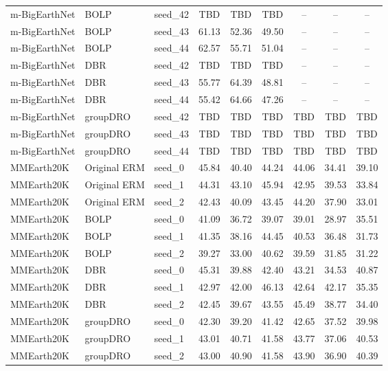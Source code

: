 \documentclass[11pt]{article}
\begin{document}
\begin{table}[h!]
{\begin{tabular}{lllcccccc}
m-BigEarthNet & BOLP & seed\_42 & TBD & TBD & TBD & -- & -- & -- \\
m-BigEarthNet & BOLP & seed\_43 & 61.13 & 52.36 & 49.50 & -- & -- & -- \\
m-BigEarthNet & BOLP & seed\_44 & 62.57 & 55.71 & 51.04 & -- & -- & -- \\

m-BigEarthNet & DBR & seed\_42 & TBD & TBD & TBD & -- & -- & -- \\
m-BigEarthNet & DBR & seed\_43 & 55.77 & 64.39 & 48.81 & -- & -- & -- \\
m-BigEarthNet & DBR & seed\_44 & 55.42 & 64.66 & 47.26 & -- & -- & -- \\

m-BigEarthNet & groupDRO & seed\_42 & TBD & TBD & TBD & TBD & TBD & TBD \\
m-BigEarthNet & groupDRO & seed\_43 & TBD & TBD & TBD & TBD & TBD & TBD \\
m-BigEarthNet & groupDRO & seed\_44 & TBD & TBD & TBD & TBD & TBD & TBD \\

\midrule

MMEarth20K & Original ERM & seed\_0 & 45.84 & 40.40 & 44.24 & 44.06 & 34.41 & 39.10 \\
MMEarth20K & Original ERM & seed\_1 & 44.31 & 43.10 & 45.94 & 42.95 & 39.53 & 33.84 \\
MMEarth20K & Original ERM & seed\_2 & 42.43 & 40.09 & 43.45 & 44.20 & 37.90 & 33.01 \\

MMEarth20K & BOLP & seed\_0 & 41.09 & 36.72 & 39.07 & 39.01 & 28.97 & 35.51 \\
MMEarth20K & BOLP & seed\_1 & 41.35 & 38.16 & 44.45 & 40.53 & 36.48 & 31.73 \\
MMEarth20K & BOLP & seed\_2 & 39.27 & 33.00 & 40.62 & 39.59 & 31.85 & 31.22 \\

MMEarth20K & DBR & seed\_0 & 45.31 & 39.88 & 42.40 & 43.21 & 34.53 & 40.87 \\
MMEarth20K & DBR & seed\_1 & 42.97 & 42.00 & 46.13 & 42.64 & 42.17 & 35.35 \\
MMEarth20K & DBR & seed\_2 & 42.45 & 39.67 & 43.55 & 45.49 & 38.77 & 34.40 \\

MMEarth20K & groupDRO & seed\_0 & 42.30 & 39.20 & 41.42 & 42.65 & 37.52 & 39.98 \\
MMEarth20K & groupDRO & seed\_1 & 43.01 & 40.71 & 41.58 & 43.77 & 37.06 & 40.53 \\
MMEarth20K & groupDRO & seed\_2 & 43.00 & 40.90 & 41.58 & 43.90 & 36.90 & 40.39 \\


\end{tabular}}
\end{table}
\end{document}
